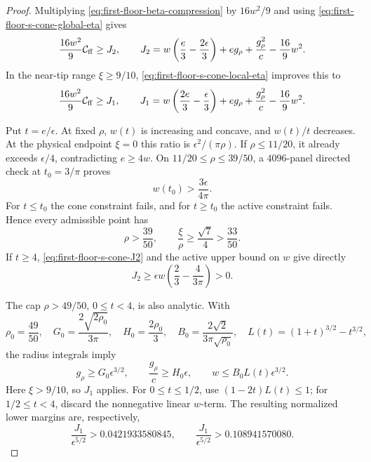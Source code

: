 \documentclass[11pt]{article}
\theoremstyle{remark}
\begin{document}
\begin{proof}
Multiplying \eqref{eq:first-floor-beta-compression} by $16w^2/9$ and using
\eqref{eq:first-floor-s-cone-global-eta} gives
\begin{equation}
 \frac{16w^2}{9}\mathcal C_{\rm ff}\geq J_2,
 \qquad
 J_2=w\left(\frac e3-\frac{2\epsilon}{3}\right)
 +eg_\rho+\frac{g_\rho^2}{c}-\frac{16}{9}w^2.
 \label{eq:first-floor-s-cone-J2}
\end{equation}
In the near-tip range $\xi\geq9/10$,
\eqref{eq:first-floor-s-cone-local-eta} improves this to
\begin{equation}
 \frac{16w^2}{9}\mathcal C_{\rm ff}\geq J_1,
 \qquad
 J_1=w\left(\frac{2e}{3}-\frac\epsilon3\right)
 +eg_\rho+\frac{g_\rho^2}{c}-\frac{16}{9}w^2.
 \label{eq:first-floor-s-cone-J1}
\end{equation}

Put $t=e/\epsilon$.  At fixed $\rho$, $w(t)$ is increasing and concave,
and $w(t)/t$ decreases.  At the physical endpoint $\xi=0$ this ratio is
$\epsilon^2/(\pi\rho)$.  If $\rho\leq11/20$, it already exceeds
$\epsilon/4$, contradicting $e\geq4w$.  On
$11/20\leq\rho\leq39/50$, a $4096$-panel directed check at $t_0=3/\pi$
proves
\[
 w(t_0)>\frac{3\epsilon}{4\pi}.
\]
For $t\leq t_0$ the cone constraint fails, and for $t\geq t_0$ the active
constraint fails.  Hence every admissible point has
\begin{equation}
 \rho>\frac{39}{50},\qquad
 \frac\xi\rho\geq\frac{\sqrt7}{4}>\frac{33}{50}.
 \label{eq:first-floor-s-cone-domain-reduction}
\end{equation}
If $t\geq4$, \eqref{eq:first-floor-s-cone-J2} and the active upper bound on
$w$ give directly
\begin{equation}
 J_2\geq\epsilon w
 \left(\frac23-\frac4{3\pi}\right)>0.
 \label{eq:first-floor-s-cone-large-t}
\end{equation}

The cap $\rho>49/50$, $0\leq t<4$, is also analytic.  With
\[
 \rho_0=\frac{49}{50},\quad
 G_0=\frac{2\sqrt{2\rho_0}}{3\pi},\quad
 H_0=\frac{2\rho_0}{3},\quad
 B_0=\frac{2\sqrt2}{3\pi\sqrt{\rho_0}},
 \quad L(t)=(1+t)^{3/2}-t^{3/2},
\]
the radius integrals imply
\begin{equation}
 g_\rho\geq G_0\epsilon^{3/2},\qquad
 \frac{g_\rho}{c}\geq H_0\epsilon,\qquad
 w\leq B_0L(t)\epsilon^{3/2}.
 \label{eq:first-floor-s-cone-cap-bounds}
\end{equation}
Here $\xi>9/10$, so $J_1$ applies.  For $0\leq t\leq1/2$, use
$(1-2t)L(t)\leq1$; for $1/2\leq t<4$, discard the nonnegative linear
$w$-term.  The resulting normalized lower margins are, respectively,
\begin{equation}
 \frac{J_1}{\epsilon^{5/2}}>0.0421933580845,
 \qquad
 \frac{J_1}{\epsilon^{5/2}}>0.108941570080.
 \label{eq:first-floor-s-cone-cap-margins}
\end{equation}


\end{proof}
\end{document}
